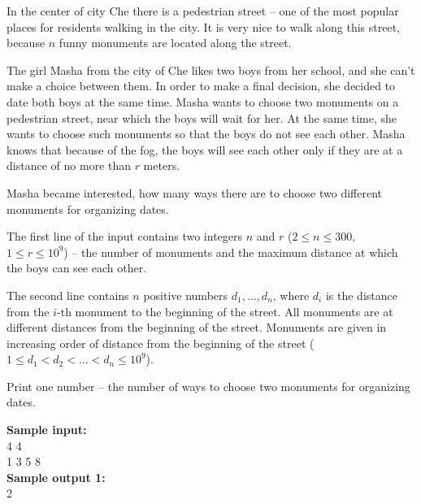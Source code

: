 \documentclass[a4paper]{article}
\begin{document}
In the center of city Che there is a pedestrian street -- one of the most popular places for residents walking in the city. It is very nice to walk along this street, because $n$ funny monuments are located along the street.

The girl Masha from the city of Che likes two boys from her school, and she can't make a choice between them. In order to make a final decision, she decided to date both boys at the same time. Masha wants to choose two monuments on a pedestrian street, near which the boys will wait for her. At the same time, she wants to choose such monuments so that the boys do not see each other. Masha knows that because of the fog, the boys will see each other only if they are at a distance of no more than $r$ meters.

Masha became interested, how many ways there are to choose two different monuments for organizing dates.

The first line of the input contains two integers $n$ and $r$ ($2 \le n \le 300$, $1 \le r \le 10^9$) -- the number of monuments and the maximum distance at which the boys can see each other.

The second line contains $n$ positive numbers $d_1, \ldots, d_n$, where $d_i$ is the distance from the $i$-th monument to the beginning of the street. All monuments are at different distances from the beginning of the street. Monuments are given in increasing order of distance from the beginning of the street ($1 \le d_1 < d_2 < \ldots < d_n \le 10^9$).

Print one number -- the number of ways to choose two monuments for organizing dates.

\LINE

\noindent \textbf{Sample input:}\\
4 4\\
1 3 5 8\\


\noindent \textbf{Sample output 1:}\\
2
\end{document}

